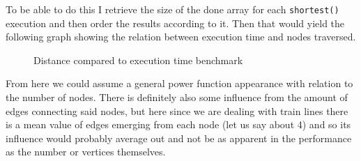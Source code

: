\documentclass[a4paper,11pt]{article}
\begin{document}
To be able to do this I retrieve the size of the done array for each {\tt shortest()} execution and then order the results according to it. Then that would yield the following graph showing the relation between execution time and nodes traversed.
\begin{figure}[H]
    \centering
    \caption{Distance compared to execution time benchmark}
    \label{fig:plot1}
\end{figure}

From here we could assume a general power function appearance with relation to the number of nodes. There is definitely also some influence from the amount of edges connecting said nodes, but here since we are dealing with train lines there is a mean value of edges emerging from each node (let us say about 4) and so its influence would probably average out and not be as apparent in the performance as the number or vertices themselves.
\end{document}
